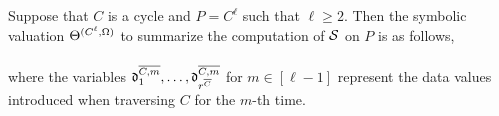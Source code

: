 \begin{proposition}\label{prop-sum-cycle}
Suppose that $C$ is a cycle and $P=C^{\ell}$ such that $\ell \ge 2$. Then the symbolic valuation $\Theta^{(C^\ell,\Omega)}$ to summarize the computation of ${\mathcal{S} }$ on $P$ is as follows,\medskip\\
\medskip\\
where the variables $\mathfrak{d}^{\overline{C , m}}_{1},\dots, \mathfrak{d}^{\overline{C , m}}_{r^{\overline{C}}}$ for $m\in [\ell-1]$
 represent the data values introduced when traversing $C$ for the $m$-th time.
\end{proposition}

